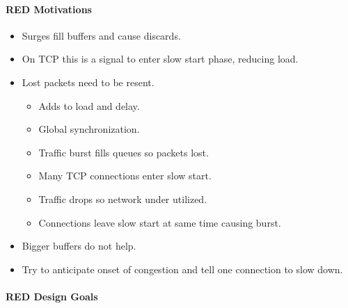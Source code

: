 \begin{definition}
\paragraph{RED Motivations}\label{par:Random_Early_Discard_Motivations}
\begin{itemize}[noitemsep]
\item Surges fill buffers and cause discards.
\item On TCP this is a signal to enter slow start phase, reducing load.
\item Lost packets need to be resent.
  \begin{itemize}[noitemsep]
  \item Adds to load and delay.
  \item Global synchronization.
  \item Traffic burst fills queues so packets lost.
  \item Many TCP connections enter slow start.
  \item Traffic drops so network under utilized.
  \item Connections leave slow start at same time causing burst.
  \end{itemize}
\item Bigger buffers do not help.
\item Try to anticipate onset of congestion and tell one connection to slow down.
\end{itemize}

\paragraph{RED Design Goals}\label{par:Random_Early_Discard_Design_Goals}

\end{definition}
